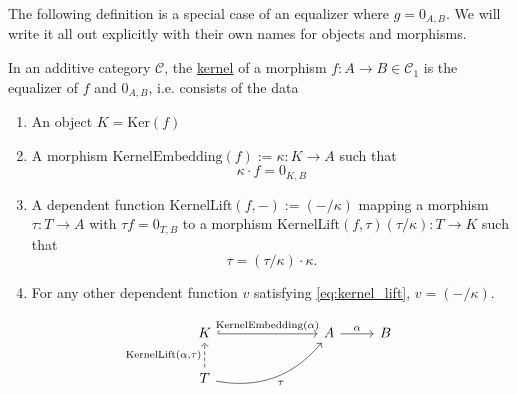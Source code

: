 The following definition is a special case of an equalizer where $g = 0_{A,B}$. We will write it all out explicitly with their
own names for objects and morphisms.

\begin{definition}[Kernel]
In an additive category $\mathcal{C}$, the \ul{kernel} of a morphism $f : A \rightarrow B \in \mathcal{C}_{1}$ is the equalizer
of $f$ and $0_{A,B}$, i.e. consists of the data
\begin{enumerate}
\renewcommand{\labelenumi}{(\theenumi)}
\item An object $K = \mathrm{Ker}(f)$
\item A morphism $\mathrm{KernelEmbedding}(f) := \kappa : K \rightarrow A$ such that
\[
\kappa \cdot f = 0_{K,B}
\]
\item A dependent function $\mathrm{KernelLift}(f,-) := ( - /\kappa)$ mapping a morphism $\tau : T \rightarrow A$ with $\tau f = 0_{T,B}$ to a
morphism $\mathrm{KernelLift}(f,\tau) (\tau / \kappa) : T \rightarrow K$ such that
\[
\tau =\label{eq:kernel_lift} (\tau / \kappa) \cdot \kappa.
\]
\item For any other dependent function $v$ satisfying \eqref{eq:kernel_lift}, $v = ( - / \kappa)$.
\end{enumerate}
\[
\begin{tikzcd}
K \arrow[rrr, "\mathrm{KernelEmbedding}(\alpha)", hook]                                     &  &  & A \arrow[r, "\alpha"] & B \\
T \arrow[rrru, "\tau"', bend right] \arrow[u, "{\mathrm{KernelLift}(\alpha,\tau)}", dashed] &  &  &                       &  
\end{tikzcd}
\]
\end{definition}

